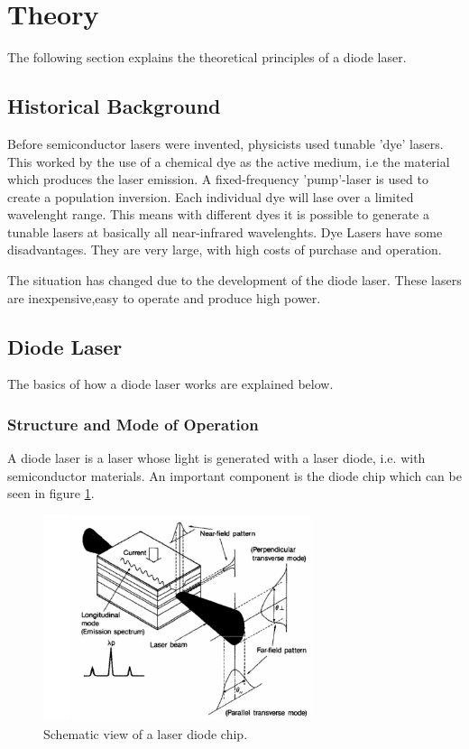 \section{Theory}
\label{sec:theory}

The following section explains the theoretical principles of a diode laser.

\subsection{Historical Background}
\label{sec:Historical Background}

Before semiconductor lasers were invented, physicists used tunable 'dye' lasers.
This worked by the use of a chemical dye as the active medium, i.e the material which produces the laser emission.
A fixed-frequency 'pump'-laser is used to create a population inversion. Each individual dye will lase over a limited wavelenght range.
This means with different dyes it is possible to generate a tunable lasers at basically all near-infrared wavelenghts.
Dye Lasers have some disadvantages. They are very large, with high costs of purchase and operation.

The situation has changed due to the development of the diode laser. These lasers are inexpensive,easy to operate and produce high power.

\subsection{Diode Laser}
\label{sec:Diode Laser}

The basics of how a diode laser works are explained below.

\subsubsection{Structure and Mode of Operation}
\label{Structure and Mode of Operation}

A diode laser is a laser whose light is generated with a laser diode, i.e. with semiconductor materials.
An important component is the diode chip which can be seen in figure \ref{fig:diodechip}.

\begin{figure}[H]
    \centering
    \includegraphics[width=0.7\textwidth]{content/graphics/laserdiodechip.jpg}
    \caption{Schematic view of a laser diode chip.} %
    \label{fig:diodechip}
\end{figure}

